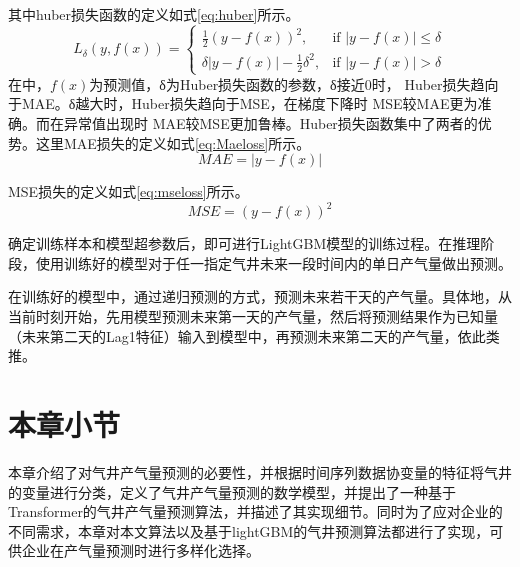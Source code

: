 其中huber损失函数的定义如式\eqref{eq:huber}所示。
\begin{equation}
    L_{\delta}(y, f(x)) = 
        \begin{cases} 
        \frac{1}{2}(y - f(x))^2, & \text{if } |y - f(x)| \leq \delta \\
        \delta|y - f(x)| - \frac{1}{2}\delta^2, & \text{if } |y - f(x)| > \delta
        \end{cases}
    \label{eq:huber}
\end{equation}
在中，\(f(x)\)为预测值，δ为Huber损失函数的参数，δ接近0时，
Huber损失趋向于MAE。δ越大时，Huber损失趋向于MSE，在梯度下降时 MSE较MAE更为准确。而在异常值出现时 MAE较MSE更加鲁棒。Huber损失函数集中了两者的优势。这里MAE损失的定义如式\eqref{eq:Maeloss}所示。
\begin{equation}
    MAE = |y - f(x)|
    \label{eq:Maeloss}
\end{equation}

MSE损失的定义如式\eqref{eq:mseloss}所示。
\begin{equation}
    MSE = (y - f(x))^2
    \label{eq:mseloss}
\end{equation}

确定训练样本和模型超参数后，即可进行LightGBM模型的训练过程。在推理阶段，使用训练好的模型对于任一指定气井未来一段时间内的单日产气量做出预测。

在训练好的模型中，通过递归预测的方式，预测未来若干天的产气量。具体地，从当前时刻开始，先用模型预测未来第一天的产气量，然后将预测结果作为已知量（未来第二天的Lag1特征）输入到模型中，再预测未来第二天的产气量，依此类推。

\section{本章小节}
本章介绍了对气井产气量预测的必要性，并根据时间序列数据协变量的特征将气井的变量进行分类，定义了气井产气量预测的数学模型，并提出了一种基于Transformer的气井产气量预测算法，并描述了其实现细节。同时为了应对企业的不同需求，本章对本文算法以及基于lightGBM的气井预测算法都进行了实现，可供企业在产气量预测时进行多样化选择。
